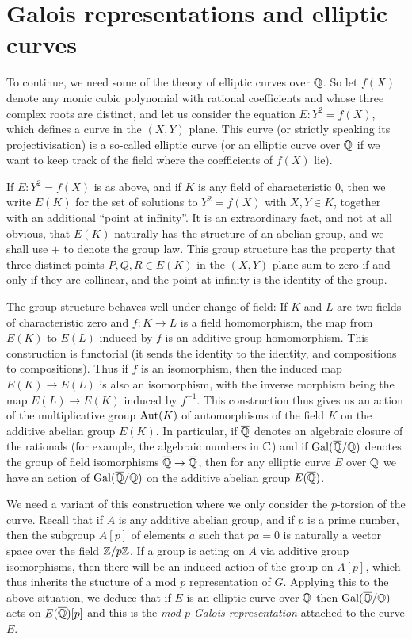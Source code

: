 \section{Galois representations and elliptic curves}

To continue, we need some of the theory of elliptic curves over $\mathbb{Q}$. So let $f(X)$ denote any monic cubic polynomial with rational coefficients and whose three complex roots are distinct, and let us consider the equation $E:Y^2=f(X)$, which defines a curve in the $(X,Y)$ plane. This curve (or strictly speaking its projectivisation) is a so-called elliptic curve (or an elliptic curve over $\mathbb{Q}$ if we want to keep track of the field where the coefficients of $f(X)$ lie). 

If $E:Y^2=f(X)$ is as above, and if $K$ is any field of characteristic 0, then we write $E(K)$ for the set of solutions to $Y^2=f(X)$ with $X,Y\in K$, together with an additional ``point at infinity''. It is an extraordinary fact, and not at all obvious, that $E(K)$ naturally has the structure of an abelian group, and we shall use $+$ to denote the group law. This group structure has the property that three distinct points $P,Q,R\in E(K)$ in the $(X,Y)$ plane sum to zero if and only if they are collinear, and the point at infinity is the identity of the group.

The group structure behaves well under change of field: If $K$ and $L$ are two fields of characteristic zero and $f:K\to L$ is a field homomorphism, the map from $E(K)$ to $E(L)$ induced by $f$ is an additive group homomorphism. This construction is functorial (it sends the identity to the identity, and compositions to compositions). Thus if $f$ is an isomorphism, then the induced map $E(K)\to E(L)$ is also an isomorphism, with the inverse morphism being the map $E(L)\to E(K)$ induced by $f^{-1}$. This construction thus gives us an action of the multiplicative group $\operatorname{Aut}(K)$ of automorphisms of the field $K$ on the additive abelian group $E(K)$. In particular, if $\overline{\mathbb{Q}}$ denotes an algebraic closure of the rationals (for example, the algebraic numbers in $\mathbb{C}$) and if $\operatorname{Gal}(\overline{\mathbb{Q}}/\mathbb{Q})$ denotes the group of field isomorphisms $\overline{\mathbb{Q}}\to\overline{\mathbb{Q}}$, then for any elliptic curve $E$ over $\mathbb{Q}$ we have an action of $\operatorname{Gal}(\overline{\mathbb{Q}}/\mathbb{Q})$ on the additive abelian group $E(\overline{\mathbb{Q}})$.

We need a variant of this construction where we only consider the $p$-torsion of the curve. Recall that if $A$ is any additive abelian group, and if $p$ is a prime number, then the subgroup $A[p]$ of elements $a$ such that $pa=0$ is naturally a vector space over the field $\mathbb{Z}/p\mathbb{Z}$. If a group is acting on $A$ via additive group isomorphisms, then there will be an induced action of the group on $A[p]$, which thus inherits the stucture of a mod $p$ representation of $G$. Applying this to the above situation, we deduce that if $E$ is an elliptic curve over $\mathbb{Q}$ then $\operatorname{Gal}(\overline{\mathbb{Q}}/\mathbb{Q})$ acts on $E(\overline{\mathbb{Q}})[p]$ and this is the \emph{mod $p$ Galois representation} attached to the curve $E$.

